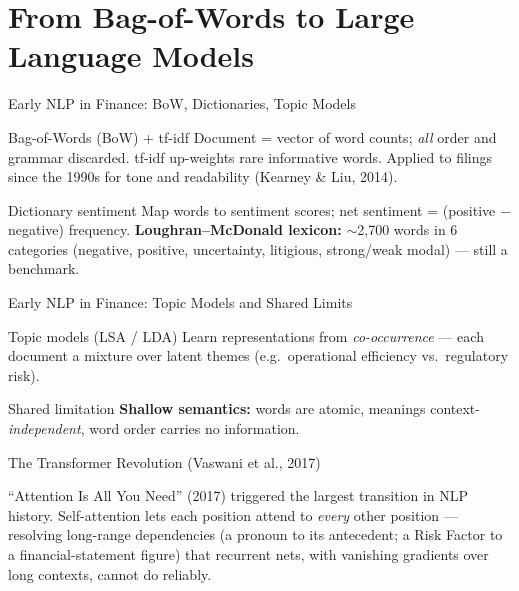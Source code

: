 \documentclass[9pt,t]{beamer}
\begin{document}
\section{From Bag-of-Words to Large Language Models}

\begin{frame}{Early NLP in Finance: BoW, Dictionaries, Topic Models}

\begin{block}{Bag-of-Words (BoW) + tf-idf}
Document = vector of word counts; \emph{all} order and grammar discarded. tf-idf
up-weights rare informative words. Applied to filings since the 1990s for tone
and readability (Kearney \& Liu, 2014).
\end{block}

\begin{block}{Dictionary sentiment}
Map words to sentiment scores; net sentiment = (positive $-$ negative) frequency.
\textbf{Loughran--McDonald lexicon:} $\sim$2{,}700 words in 6 categories
(negative, positive, uncertainty, litigious, strong/weak modal) --- still a benchmark.
\end{block}

\end{frame}

\begin{frame}{Early NLP in Finance: Topic Models and Shared Limits}

\begin{block}{Topic models (LSA / LDA)}
Learn representations from \emph{co-occurrence} --- each document a mixture over
latent themes (e.g.\ operational efficiency vs.\ regulatory risk).
\end{block}

\medskip
\begin{alertblock}{Shared limitation}
\textbf{Shallow semantics:} words are atomic, meanings context-\emph{independent},
word order carries no information.
\end{alertblock}
\end{frame}

\begin{frame}{The Transformer Revolution (Vaswani et al., 2017)}

\begin{bigpicture}
``Attention Is All You Need'' (2017) triggered the largest transition in NLP
history. \alert{Self-attention} lets each position attend to \emph{every} other
position --- resolving long-range dependencies (a pronoun to its antecedent; a
Risk Factor to a financial-statement figure) that recurrent nets, with vanishing
gradients over long contexts, cannot do reliably.
\end{bigpicture}
\end{frame}
\end{document}
